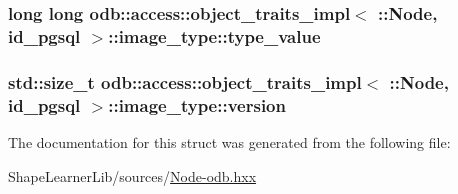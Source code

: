 \subsubsection[{type\+\_\+value}]{\setlength{\rightskip}{0pt plus 5cm}long long odb\+::access\+::object\+\_\+traits\+\_\+impl$<$ \+::{\bf Node}, id\+\_\+pgsql $>$\+::image\+\_\+type\+::type\+\_\+value}\label{structodb_1_1access_1_1object__traits__impl_3_01_1_1_node_00_01id__pgsql_01_4_1_1image__type_ab198d695cb6931dbd7cc9f928200980c}
\hypertarget{structodb_1_1access_1_1object__traits__impl_3_01_1_1_node_00_01id__pgsql_01_4_1_1image__type_a8f102508d0caf21a4c96920e53cd683a}{}
\subsubsection[{version}]{\setlength{\rightskip}{0pt plus 5cm}std\+::size\+\_\+t odb\+::access\+::object\+\_\+traits\+\_\+impl$<$ \+::{\bf Node}, id\+\_\+pgsql $>$\+::image\+\_\+type\+::version}\label{structodb_1_1access_1_1object__traits__impl_3_01_1_1_node_00_01id__pgsql_01_4_1_1image__type_a8f102508d0caf21a4c96920e53cd683a}


The documentation for this struct was generated from the following file\+:\begin{DoxyCompactItemize}
\item 
Shape\+Learner\+Lib/sources/\hyperlink{_node-odb_8hxx}{Node-\/odb.\+hxx}\end{DoxyCompactItemize}
